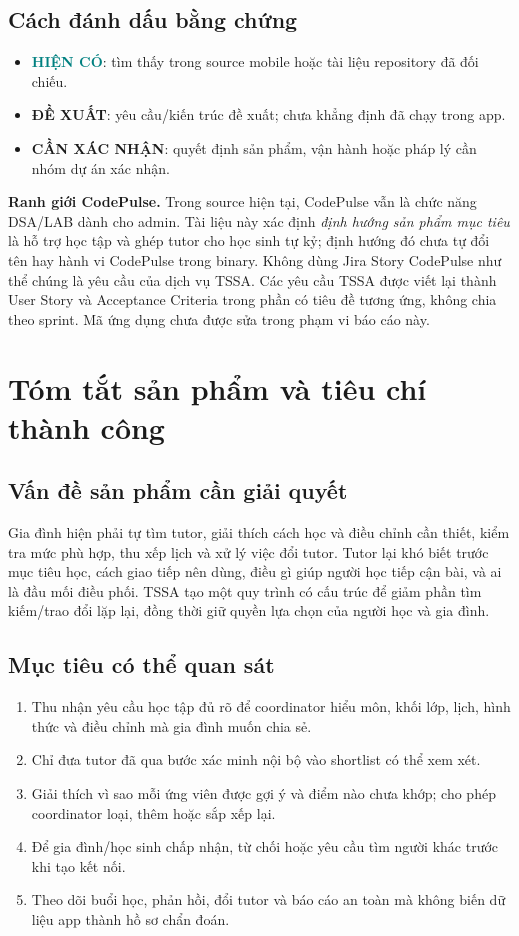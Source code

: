 \documentclass[11pt,a4paper]{article}
\newcommand{\statuscurrent}{\textcolor{teal}{\textbf{HIỆN CÓ}}}
\newcommand{\statusproposal}{\textcolor{ink}{\textbf{ĐỀ XUẤT}}}
\newcommand{\statusopen}{\textcolor{muted}{\textbf{CẦN XÁC NHẬN}}}
\begin{document}
\subsection{Cách đánh dấu bằng chứng}
\begin{itemize}
  \item \statuscurrent{}: tìm thấy trong source mobile hoặc tài liệu repository đã đối chiếu.
  \item \statusproposal{}: yêu cầu/kiến trúc đề xuất; chưa khẳng định đã chạy trong app.
  \item \statusopen{}: quyết định sản phẩm, vận hành hoặc pháp lý cần nhóm dự án xác nhận.
\end{itemize}

\textbf{Ranh giới CodePulse.} Trong source hiện tại, CodePulse vẫn là chức năng DSA/LAB dành cho admin. Tài liệu này xác định \emph{định hướng sản phẩm mục tiêu} là hỗ trợ học tập và ghép tutor cho học sinh tự kỷ; định hướng đó chưa tự đổi tên hay hành vi CodePulse trong binary. Không dùng Jira Story CodePulse như thể chúng là yêu cầu của dịch vụ TSSA. Các yêu cầu TSSA được viết lại thành User Story và Acceptance Criteria trong phần có tiêu đề tương ứng, không chia theo sprint. Mã ứng dụng chưa được sửa trong phạm vi báo cáo này.

\section{Tóm tắt sản phẩm và tiêu chí thành công}

\subsection{Vấn đề sản phẩm cần giải quyết}
Gia đình hiện phải tự tìm tutor, giải thích cách học và điều chỉnh cần thiết, kiểm tra mức phù hợp, thu xếp lịch và xử lý việc đổi tutor. Tutor lại khó biết trước mục tiêu học, cách giao tiếp nên dùng, điều gì giúp người học tiếp cận bài, và ai là đầu mối điều phối. TSSA tạo một quy trình có cấu trúc để giảm phần tìm kiếm/trao đổi lặp lại, đồng thời giữ quyền lựa chọn của người học và gia đình.

\subsection{Mục tiêu có thể quan sát}
\begin{enumerate}
  \item Thu nhận yêu cầu học tập đủ rõ để coordinator hiểu môn, khối lớp, lịch, hình thức và điều chỉnh mà gia đình muốn chia sẻ.
  \item Chỉ đưa tutor đã qua bước xác minh nội bộ vào shortlist có thể xem xét.
  \item Giải thích vì sao mỗi ứng viên được gợi ý và điểm nào chưa khớp; cho phép coordinator loại, thêm hoặc sắp xếp lại.
  \item Để gia đình/học sinh chấp nhận, từ chối hoặc yêu cầu tìm người khác trước khi tạo kết nối.
  \item Theo dõi buổi học, phản hồi, đổi tutor và báo cáo an toàn mà không biến dữ liệu app thành hồ sơ chẩn đoán.
\end{enumerate}
\end{document}
